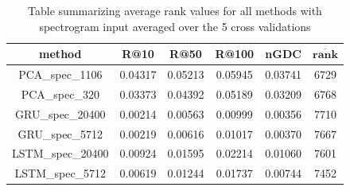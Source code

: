\begin{table}[h!]
\centering
\renewcommand{\arraystretch}{1.5}
\begin{tabu} to 1\textwidth { | c || c | c | c | c | c |}
 \hline
 \textbf{method} & \textbf{R@10} & \textbf{R@50} & \textbf{R@100} & \textbf{nGDC} & $ \boldsymbol{\overline{rank}} $ \\
 \hline
 \hline
 PCA\_spec\_1106 & 0.04317 & 0.05213 &  0.05945 & 0.03741 & 6729 \\
 \hline
 PCA\_spec\_320 & 0.03373 & 0.04392 &  0.05189 & 0.03209 & 6768 \\
 \hline
 GRU\_spec\_20400 & 0.00214 & 0.00563 & 0.00999 & 0.00356 & 7710 \\
 \hline
 GRU\_spec\_5712 & 0.00219 & 0.00616 & 0.01017 & 0.00370 & 7667 \\
 \hline
 LSTM\_spec\_20400 & 0.00924 & 0.01595 & 0.02214 & 0.01060 & 7601 \\
 \hline
 LSTM\_spec\_5712 & 0.00619 & 0.01244 & 0.01737 &  0.00744 & 7452 \\
 \hline
\end{tabu} \\
\caption{Table summarizing average rank values for all methods with spectrogram input averaged over the 5 cross validations}
\label{table:spec_methods}
\end{table}
 

